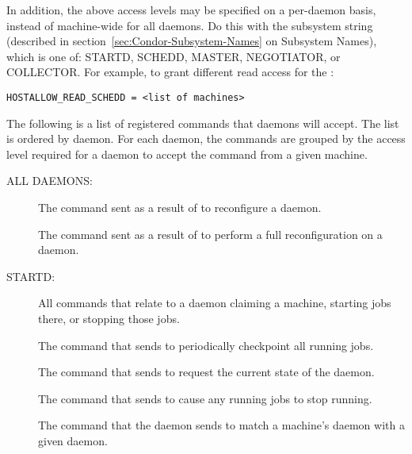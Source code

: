 In addition, the above access levels may be specified on a
per-daemon basis, instead of machine-wide for all daemons.
Do this with the subsystem string (described in
section~\ref{sec:Condor-Subsystem-Names} on Subsystem Names),
which is one of: STARTD, SCHEDD, MASTER, NEGOTIATOR,
or COLLECTOR.
For example, to grant different read access for the :
\footnotesize
\begin{verbatim}
HOSTALLOW_READ_SCHEDD = <list of machines>
\end{verbatim}
\normalsize

The following is a list of registered commands that daemons will
accept.  The list is ordered by daemon.
For each daemon, the commands are grouped by the access level
required for a daemon to accept the command from a
given machine.

ALL DAEMONS:

\begin{description}
\item[]

  The command sent as a result of  to reconfigure a daemon.

\item[]

  The command sent as a result of 
  to perform a full reconfiguration on a daemon. 
\end{description}

STARTD:

\begin{description}
\item[] 

All commands that relate to a  daemon claiming
  a machine, starting jobs there, or stopping those jobs.

The command that  sends to periodically checkpoint
  all running jobs.

\item[]

The command that  sends to request the
  current state of the  daemon.

\item[]
The command that  sends to cause
  any running jobs to stop running.

\item[]
The command that the  daemon sends to
  match a machine's  daemon with a given 
  daemon.
\end{description}

